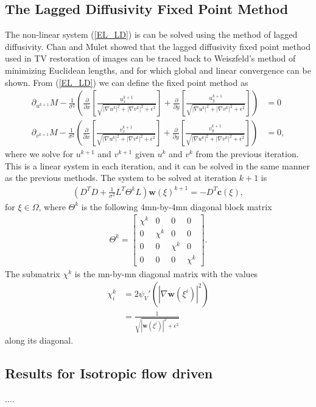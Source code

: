 \subsection{The Lagged Diffusivity Fixed Point Method}
The non-linear system (\ref{EL_LD}) is can be solved using the method of lagged diffusivity. Chan and Mulet \cite{Chan1999} showed that the lagged diffusivity fixed point method used in TV restoration of images can be traced back to Weiszfeld's method of minimizing Euclidean lengths, and for which global and linear convergence can be shown. From (\ref{EL_LD}) we can define the fixed point method as
\begin{align*}
\partial_{u^{k+1}} M - \frac{1}{\sigma^2} \left(\frac{\partial}{\partial x}\left[ \frac{u^{k+1}_x}{\sqrt{|\nabla u^k|^2 + |\nabla v^k|^2 + \epsilon^2}} \right] + \frac{\partial}{\partial y} \left[ \frac{u^{k+1}_y}{\sqrt{|\nabla u^k|^2 + |\nabla v^k|^2 + \epsilon^2}} \right] \right) &= 0 \\
\partial_{v^{k+1}} M - \frac{1}{\sigma^2} \left(\frac{\partial}{\partial x}\left[ \frac{v^{k+1}_x}{\sqrt{|\nabla u^k|^2 + |\nabla v^k|^2 + \epsilon^2}} \right] + \frac{\partial}{\partial y} \left[ \frac{v^{k+1}_y}{\sqrt{|\nabla u^k|^2 + |\nabla v^k|^2 + \epsilon^2}} \right] \right) &= 0,
\end{align*}
where we solve for $u^{k+1}$ and $v^{k+1}$ given $u^k$ and $v^k$ from the previous iteration. This is a linear system in each iteration, and it can be solved in the same manner as the previous methods. The system to be solved at iteration $k+1$ is
\begin{align*}
(D^T D + \frac{1}{\sigma^2} L^T\Theta^{k}L) \textbf{w}(\xi)^{k+1} = - D^T \textbf{c}(\xi),
\end{align*}
for $\xi \in \Omega$, where $\Theta^k$ is the following 4mn-by-4mn diagonal block matrix
\begin{align*}
\Theta^k = \left[
\begin{array}{c|c|c|c}
\chi^k & 0 & 0 & 0 \\ \hline
0 & \chi^k & 0 & 0 \\ \hline
0 & 0 & \chi^k & 0 \\ \hline
0 & 0 & 0 & \chi^k
\end{array}
\right].
\end{align*}
The submatrix $\chi^k$ is the mn-by-mn diagonal matrix with the values 
\begin{align*}
\chi^k_i &= 2 \psi_V'\left( |\nabla \textbf{w}(\xi^i)|^2 \right) \\
& = \frac{1}{\sqrt{|\textbf{w}(\xi^i)|^2 + \epsilon^2}}
\end{align*}
along its diagonal.

\subsection{Results for Isotropic flow driven}
....

